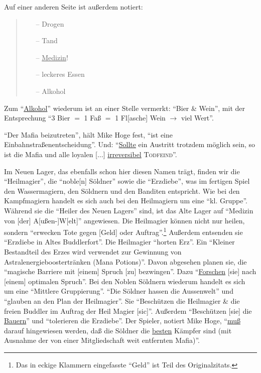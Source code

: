 \documentclass[a5paper,pagesize,numbers=noenddot]{scrbook}
\begin{document}
\noindent Auf einer anderen Seite ist außerdem notiert:

\begin{quote}
   \begin{itemize}
      \item[--] Drogen
      \item[--] Tand
      \item[--] \uline{Medizin}!
      \item[--] leckeres Essen
      \item[--] Alkohol\autocite[S.~13]{orpheus_b_scribbles}
   \end{itemize}
\end{quote}

\noindent Zum \enquote{\uline{Alkohol}} wiederum ist an einer Stelle vermerkt: \enquote{Bier \& Wein}, mit der Entsprechung \enquote{3 Bier $=$ 1 Faß $=$ 1 Fl[asche] Wein $\rightarrow$ viel Wert}.\autocite[S.~6]{orpheus_b_scribbles}

\enquote{Der Mafia beizutreten}, hält Mike Hoge fest, \enquote{ist eine Einbahnstraßenentscheidung}.
Und:
\enquote{\uline{Sollte} ein Austritt trotzdem möglich sein, so ist die Mafia und alle loyalen [$\ldots$] \uline{irreversibel} \textsc{Todfeind}}.

Im Neuen Lager, das ebenfalls schon hier diesen Namen trägt, finden wir die \enquote{Heilmagier}, die \enquote{noble[n] Söldner} sowie die \enquote{Erzdiebe}, was im fertigen Spiel den Wassermagiern, den Söldnern und den Banditen entspricht.
Wie bei den Kampfmagiern handelt es sich auch bei den Heilmagiern um eine \enquote{kl. Gruppe}.
Während sie die \enquote{Heiler des Neuen Lagers} sind, ist das Alte Lager auf \enquote{Medizin von [der] A[ußen-]W[elt]} angewiesen.
Die Heilmagier können nicht nur heilen, sondern \enquote{erwecken Tote gegen [Geld] oder Auftrag}.\footnote{Das in eckige Klammern eingefasste \enquote{Geld} ist Teil des Originalzitats.}
Außerdem entsenden sie \enquote{Erzdiebe in Altes Buddlerfort}.
Die Heilmagier \enquote{horten Erz}.
Ein \enquote{Kleiner Bestandteil des Erzes wird verwendet zur Gewinnung von Astralenergieboostertränken (Mana Potions)}.
Davon abgesehen planen sie, die \enquote{magische Barriere mit [einem] Spruch [zu] bezwingen}.
Dazu \enquote{\uline{Forschen} [sie] nach [einem] optimalen Spruch}.
Bei den Noblen Söldnern wiederum handelt es sich um eine \enquote{Mittlere Gruppierung}.
\enquote{Die Söldner hassen die Aussenwelt} und \enquote{glauben an den Plan der Heilmagier}.
Sie \enquote{Beschützen die Heilmagier \& die freien Buddler im Auftrag der Heil Magier [sic]}. Außerdem \enquote{Beschützen [sie] die \uline{Bauern}} und \enquote{tolerieren die Erzdiebe}.
Der Spieler, notiert Mike Hoge, \enquote{\uline{muß} darauf hingewiesen werden, daß die Söldner die \uline{besten} Kämpfer sind (mit Ausnahme der von einer Mitgliedschaft weit entfernten Mafia)}.
\end{document}
